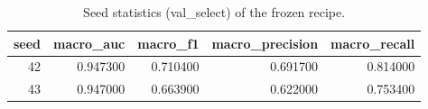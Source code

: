 \begin{table}[htbp]\centering\caption{Seed statistics (val_select) of the frozen recipe.}\label{tab:seeds}
\begin{tabular}{rrrrr}
\toprule
seed & macro_auc & macro_f1 & macro_precision & macro_recall \\
\midrule
42 & 0.947300 & 0.710400 & 0.691700 & 0.814000 \\
43 & 0.947000 & 0.663900 & 0.622000 & 0.753400 \\
\bottomrule
\end{tabular}
\end{table}
